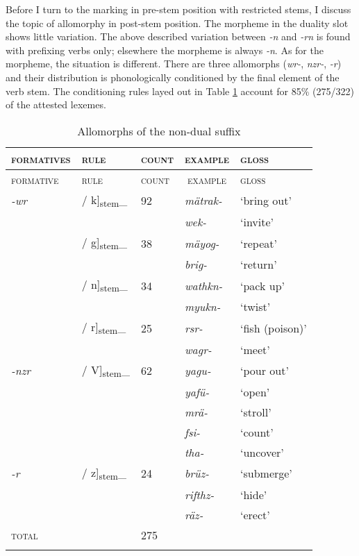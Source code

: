Before I turn to the  marking in pre-stem position with restricted stems, I discuss the topic of allomorphy in post-stem position. The  morpheme in the duality slot shows little variation. The above described variation between \emph{-n} and \emph{-rn} is found with prefixing verbs only; elsewhere the  morpheme is always \emph{-n}. As for the  morpheme, the situation is different. There are three allomorphs (\emph{wr-}, \emph{nzr-}, \emph{-r}) and their distribution is phonologically conditioned by the final element of the verb stem. The conditioning rules layed out in Table \ref{allonondual} account for 85\% (275/322) of the attested  lexemes.

\begin{longtable}[H]{lllll}
	\caption{Allomorphs of the non-dual suffix}
	\label{allonondual}\\
	\lsptoprule
	\textsc{formatives} & \textsc{rule} &\textsc{count}& \multicolumn{1}{c}{\textsc{example}}& \textsc{gloss}\\
	\hline
	\endfirsthead
	\textsc{formative} & \textsc{rule} &\textsc{count}& \multicolumn{1}{c}{\textsc{example}}& \textsc{gloss}\\
	\hline
	\endhead
	\emph{-wr}& / k]\textsubscript{\tiny{stem}}\_&92& \emph{mätrak-}& `bring out'\\
	&&& \emph{wek-}&`invite'\\
	& / g]\textsubscript{\tiny{stem}}\_	&38& \emph{mäyog-}& `repeat'\\
	&&& \emph{brig-}&`return'\\
	& / n]\textsubscript{\tiny{stem}}\_	&34& \emph{wathkn-}& `pack up'\\
	&&& \emph{myukn-}&`twist'\\
	& / r]\textsubscript{\tiny{stem}}\_	&25& \emph{rsr-}& `fish (poison)'\\
	&&& \emph{wagr-}&`meet'\\\hline
	\emph{-nzr}	& / V]\textsubscript{\tiny{stem}}\_&62& \emph{yagu-}& `pour out'\\
	&&& \emph{yafü-}& `open'\\
	&&& \emph{mrä-}& `stroll'\\
	&&& \emph{fsi-}& `count'\\
	&&& \emph{tha-}& `uncover'\\\hline
	\emph{-r}& / z]\textsubscript{\tiny{stem}}\_&24& \emph{brüz-}& `submerge'\\
	&&& \emph{rifthz-}& `hide'\\
	&&& \emph{räz-}& `erect'\\\hline
	\textsc{total}&&275&&\\
	\lspbottomrule
\end{longtable}%

